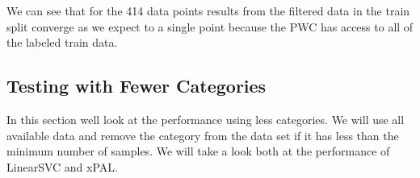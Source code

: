 
We can see that for the 414 data points results from the filtered data in the train split converge as we expect to a single point because the PWC has access to all of the labeled train data. 

\subsection{Testing with Fewer Categories}

In this section well look at the performance using less categories. We will use all available data and remove the category from the data set if it has less than the minimum number of samples. We will take a look both at the performance of LinearSVC and xPAL.